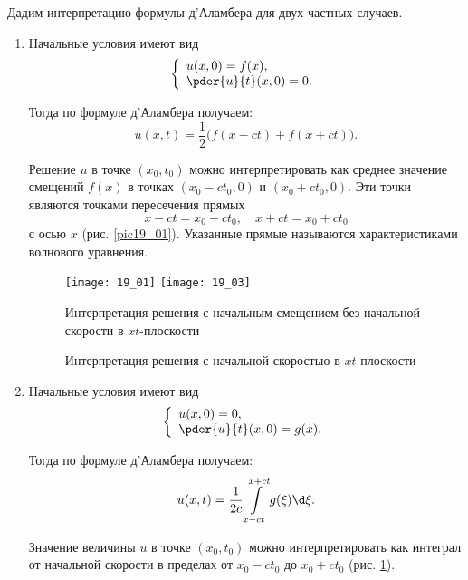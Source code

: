 
Дадим интерпретацию формулы д'Аламбера для двух частных случаев.
\begin{enumerate}
    \item Начальные условия имеют вид
    \[
        \left\{ \begin{array}{l}
            u(x, 0) = f(x), \\
            \ds \pder{u}{t}(x, 0) = 0.
        \end{array} \right.
    \]
    
    Тогда по формуле д'Аламбера получаем:
    \[
        u(x, t) = \frac{1}{2}\bigl(f(x - ct) + f(x + ct)\bigr).
    \]
    
    Решение \( u \) в точке \( (x_0, t_0) \) можно интерпретировать как среднее
    значение смещений \( f(x) \) в точках \( (x_0 - ct_0, 0) \) и
    \( (x_0 + ct_0, 0) \). Эти точки являются точками пересечения прямых
    \[
        x - ct = x_0 - ct_0, \quad x + ct = x_0 + ct_0
    \]
    с осью \( x \) (рис. \ref{pic19_01}). Указанные прямые называются характеристиками волнового
    уравнения.

    \begin{figure}[h!]
        \texttt{[image: 19\_01]}\hfill
        \texttt{[image: 19\_03]}
        \parbox{.47\textwidth}{\caption{Интерпретация решения с начальным
        смещением без начальной скорости в \( xt \)-плоскости} \label{pic19_01}}
        \hfill
        \parbox{.47\textwidth}{\caption{Интерпретация решения с начальной
        скоростью в \( xt \)-плоскости} \label{pic19_03}}
    \end{figure}

    \item Начальные условия имеют вид
    \[
        \left\{ \begin{array}{l}
            u(x, 0) = 0, \\
            \ds \pder{u}{t}(x, 0) = g(x).
        \end{array} \right.
    \]
    
    Тогда по формуле д'Аламбера получаем:
    \[
        u(x, t) = \frac{1}{2c}\int\limits_{x - ct}^{x + ct} g(\xi)\d\xi.
    \]
    
    Значение величины \( u \) в точке \( (x_0, t_0) \) можно интерпретировать
    как интеграл от начальной скорости в пределах от \( x_0 - ct_0 \) до
    \( x_0 + ct_0 \) (рис. \ref{pic19_03}).
\end{enumerate}

